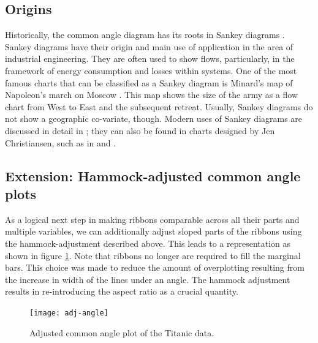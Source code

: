 \subsection{Origins}
Historically, the common angle diagram has its roots in Sankey diagrams \citep{sankey:1898}. Sankey diagrams have their origin and main use of application in the area of industrial engineering. They are often used to show flows,  particularly, in the framework of energy consumption and losses within systems.
One of the most famous charts that can be classified as a Sankey diagram is Minard's map of Napoleon's march on Moscow \citep{minard:1812}. This map  shows the size of the army as a flow chart from West to East and the subsequent retreat. Usually, Sankey diagrams do not show a geographic co-variate, though. Modern uses of Sankey diagrams are discussed in  detail in \citep{schmidt:2008};  they can also be found in charts designed by Jen Christiansen, such as in \cite{jen3} and \cite{jen2}.

%

\subsection{Extension: Hammock-adjusted common angle plots}
As a logical next step in making ribbons comparable across all their parts and multiple variables, we can additionally adjust sloped parts of the ribbons using the hammock-adjustment described above. This leads to a representation as shown in figure \ref{adj.angle}. Note that ribbons no longer are required to fill the marginal bars. This choice was made to reduce the amount of overplotting resulting from the increase in width of the lines under an angle. The hammock adjustment results in re-introducing the aspect ratio as a crucial quantity. 
\begin{figure}[hbtp]
\texttt{[image: adj-angle]}
\caption{\label{adj.angle} Adjusted common angle plot of the Titanic data.}
\end{figure}

